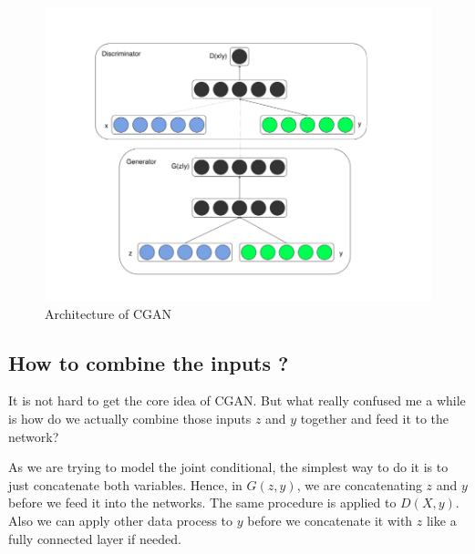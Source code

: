 \documentclass{article} %
\begin{document}
\begin{figure}[h]
	\centering
	\includegraphics[width=0.9\linewidth]{figures/CGAN.png}
	\caption{Architecture of CGAN}
	\label{fig:CGAN}
\end{figure}

\subsection{How to combine the inputs ?}

It is not hard to get the core idea of CGAN. But what really confused me a while is how do we actually combine those inputs $z$ and $y$ together and feed it to the network?

As we are trying to model the joint conditional, the simplest way to do it is to just concatenate both variables. Hence, in $G(z,y)$, we are concatenating $z$ and $y$ before we feed it into the networks. The same procedure is applied to $D(X,y)$. Also we can apply other data process to $y$ before we concatenate it with $z$ like a fully connected layer if needed.

\section{}
\end{document}
